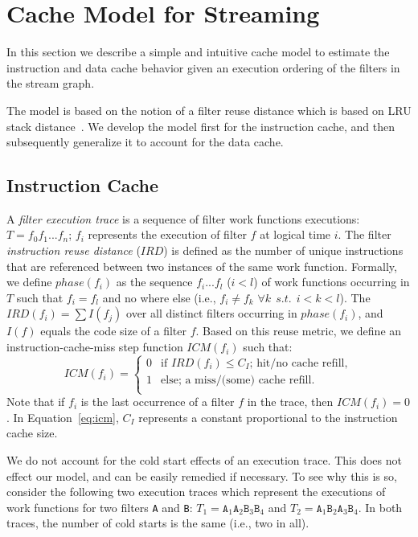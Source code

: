 \section{Cache Model for Streaming}
\label{sec:cache-model}

In this section we describe a simple and intuitive cache model to
estimate the instruction and data cache behavior given an execution
ordering of the filters in the stream graph.

The model is based on the notion of a filter reuse distance which is 
based on LRU stack distance~\cite{mattson70}. We develop the model
first for the instruction cache, and then subsequently generalize it to
account for the data cache.

\subsection{Instruction Cache}

A {\it filter execution trace} is a sequence of 
filter work functions executions: $T = f_0 f_1 ... f_n$; $f_i$ represents the
execution of filter $f$ at logical time $i$.
The filter {\it instruction reuse distance} ($IRD$) is defined as the
number of unique instructions that are referenced between two
instances of the same work function. Formally, we define $phase(f_i)$
as the sequence $f_i ... f_l$ ($i < l$) of work functions occurring in
$T$ such that $f_i = f_l$ and no where else (i.e., $f_i \neq f_k$
$\forall{k}~~s.t.~~i < k < l$). The $IRD(f_i) = \sum I(f_j)$ over all
distinct filters occurring in $phase(f_i)$, and $I(f)$ equals the code
size of a filter $f$. Based on this reuse metric, we define an
instruction-cache-miss step function $ICM(f_i)$ such that:
\begin{equation}
\label{eq:icm}
  ICM(f_i) =
    \begin{cases}
      0& \text{if $IRD(f_i) \leq C_I$; hit/no cache refill},\\
      1& \text{else; a miss/(some) cache refill}.\\
    \end{cases}
\end{equation}
Note that if $f_i$ is the last occurrence of a filter $f$ in the trace,
then $ICM(f_i) = 0$. In Equation~\ref{eq:icm}, $C_I$ represents a
constant proportional to the instruction cache size.

We do not account for the cold start
effects of an execution trace. This does not effect our model, and can
be easily remedied if necessary. To see why this is so, consider the
following two execution traces which represent the executions of work
functions for two filters \texttt{A} and \texttt{B}:
$T_1 = \texttt{A}_1\texttt{A}_2\texttt{B}_3\texttt{B}_4$
and 
$T_2 = \texttt{A}_1\texttt{B}_2\texttt{A}_3\texttt{B}_4$.
In both 
traces, the number of cold starts is the same (i.e., two in all).

